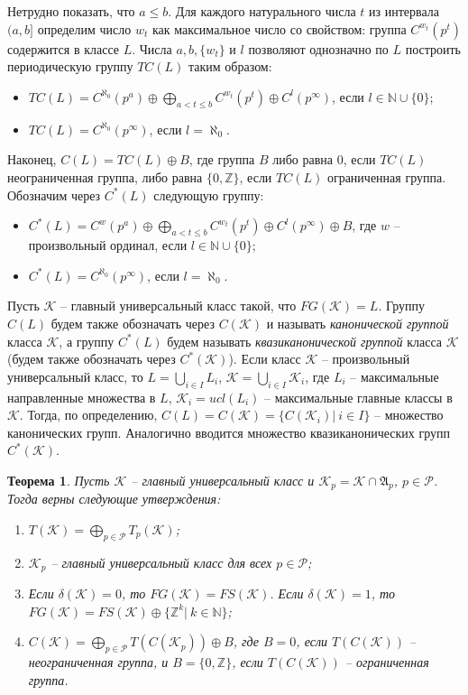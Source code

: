 \documentclass[12pt]{extarticle} %
\newtheorem{theorem}{Теорема}[section]
\def\A{{\mathfrak{A}}}
\def\K{{\mathcal{K}}}
\def\P{{\mathcal{P}}}
\def\Z{{\mathbb{Z}}}
\def\N{{\mathbb{N}}}
\begin{document}
Нетрудно показать, что $a \leq b$. Для каждого натурального числа $t$ из интервала $(a,b]$ определим число $w_t$ как максимальное число со свойством: группа $C^{w_t}(p^t)$ содержится в классе $L$. Числа $a, b, \{w_t\}$ и $l$ позволяют однозначно по $L$ построить периодическую группу $TC(L)$ таким образом:
\begin{itemize}
\item $TC(L) = C^{\aleph_0}(p^a) \oplus \bigoplus\limits_{a < t \leq b} C^{w_t}(p^t) \oplus C^l(p^\infty)$, если $l \in \N \cup\{0\}$;
\item $TC(L) = C^{\aleph_0}(p^\infty)$, если $l = \aleph_0$.
\end{itemize}

Наконец, $C(L) = TC(L) \oplus B$, где группа $B$ либо равна $0$, если $TC(L)$ неограниченная группа, либо равна $\{0, \Z\}$, если $TC(L)$ ограниченная группа. Обозначим через $C^*(L)$ следующую группу:
\begin{itemize}
\item $C^*(L) = C^{w}(p^a) \oplus \bigoplus\limits_{a < t \leq b} C^{w_t}(p^t) \oplus C^l(p^\infty) \oplus B$, где $w$ -- произвольный ординал, если $l \in \N \cup\{0\}$;
\item $C^*(L) = C^{\aleph_0}(p^\infty)$, если $l = \aleph_0$.
\end{itemize}

Пусть $\K$ -- главный универсальный класс такой, что $FG(\K) = L$. Группу $C(L)$ будем также обозначать через $C(\K)$ и называть \textit{канонической группой} класса $\K$, а группу $C^*(L)$ будем называть \textit{квазиканонической группой} класса $\K$ (будем также обозначать через $C^*(\K)$). Если класс $\K$ -- произвольный универсальный класс, то $L = \bigcup\limits_{i \in I} L_i$, $\K = \bigcup\limits_{i \in I} \K_i$, где $L_i$ -- максимальные направленные множества в $L$, $\K_i = ucl(L_i)$ -- максимальные главные классы в $\K$. Тогда, по определению, $C(L) = C(\K) = \{C(\K_i) | \ i \in I\}$ -- множество канонических групп. Аналогично вводится множество квазиканонических групп $C^*(\K)$.

\begin{theorem}
Пусть $\K$ -- главный универсальный класс и $\K_p = \K \cap \A_p$, $p \in \P$. Тогда верны следующие утверждения:
\begin{enumerate}
\item $T(\K) = \bigoplus\limits_{p \in \P} T_p(\K)$;
\item $\K_p$ -- главный универсальный класс для всех $p \in \P$;
\item Если $\delta(\K) = 0$, то $FG(\K) = FS(\K)$. Если $\delta(\K) = 1$, то $FG(\K) = FS(\K) \oplus \{\Z^k | \ k \in \N\}$;
\item $C(\K) = \bigoplus\limits_{p \in \P} T(C(\K_p)) \oplus B$, где $B = 0$, если $T(C(\K))$ -- неограниченная группа, и $B = \{0, \Z\}$, если $T(C(\K))$ -- ограниченная группа.
\end{enumerate}
\end{theorem}
\end{document}
